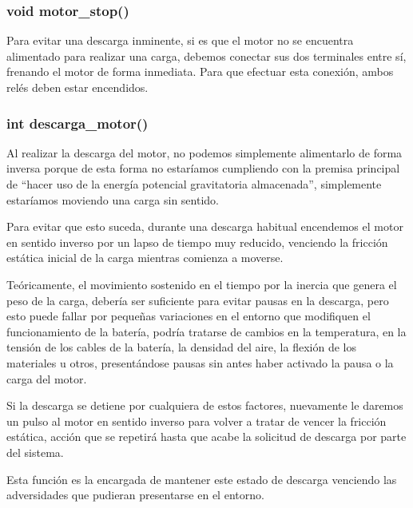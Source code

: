             \subsubsection{void motor\_stop()}
                Para evitar una descarga inminente, si es que el motor no se encuentra alimentado para realizar una carga, debemos conectar sus dos terminales entre sí, frenando el motor de forma inmediata. Para que efectuar esta conexión, ambos relés deben estar encendidos.\par

            \subsubsection{int descarga\_motor()}
                Al realizar la descarga del motor, no podemos simplemente alimentarlo de forma inversa porque de esta forma no estaríamos cumpliendo con la premisa principal de “hacer uso de la energía potencial gravitatoria almacenada”, simplemente estaríamos moviendo una carga sin sentido.\par
                Para evitar que esto suceda, durante una descarga habitual encendemos el motor en sentido inverso por un lapso de tiempo muy reducido, venciendo la fricción estática inicial de la carga mientras comienza a moverse.\par
                Teóricamente, el movimiento sostenido en el tiempo por la inercia que genera el peso de la carga, debería ser suficiente para evitar pausas en la descarga, pero esto puede fallar por pequeñas variaciones en el entorno que modifiquen el funcionamiento de la batería, podría tratarse de cambios en la temperatura, en la tensión de los cables de la batería, la densidad del aire, la flexión de los materiales u otros, presentándose pausas sin antes haber activado la pausa o la carga del motor.\par
                Si la descarga se detiene por cualquiera de estos factores, nuevamente le daremos un pulso al motor en sentido inverso para volver a tratar de vencer la fricción estática, acción que se repetirá hasta que acabe la solicitud de descarga por parte del sistema.\par
                Esta función es la encargada de mantener este estado de descarga venciendo las adversidades que pudieran presentarse en el entorno.\par

